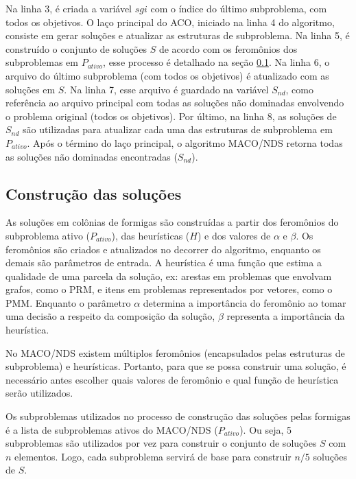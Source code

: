 Na linha 3, é criada a variável $sgi$ com o índice do último subproblema, com todos os objetivos. O laço principal do ACO, iniciado na linha 4 do algoritmo, consiste em gerar soluções e atualizar as estruturas de subproblema. Na linha 5, é construído o conjunto de soluções $S$ de acordo com os feromônios dos subproblemas em $P_{ativo}$, esse processo é detalhado na seção \ref{section_macod_solutions}. Na linha 6, o arquivo do último subproblema (com todos os objetivos) é atualizado com as soluções em $S$. Na linha 7, esse arquivo é guardado na variável $S_{nd}$, como referência ao arquivo principal com todas as soluções não dominadas envolvendo o problema original (todos os objetivos). Por último, na linha 8, as soluções de $S_{nd}$ são utilizadas para atualizar cada uma das estruturas de subproblema em $P_{ativo}$. Após o término do laço principal, o algoritmo MACO/NDS retorna todas as soluções não dominadas encontradas ($S_{nd}$).

\subsection{Construção das soluções}
\label{section_macod_solutions}

As soluções em colônias de formigas são construídas a partir dos feromônios do subproblema ativo ($P_{ativo}$), das heurísticas ($H$) e dos valores de $\alpha$ e $\beta$. Os feromônios são criados e atualizados no decorrer do algoritmo, enquanto os demais são parâmetros de entrada. A heurística é uma função que estima a qualidade de uma parcela da solução, ex: arestas em problemas que envolvam grafos, como o PRM, e itens em problemas representados por vetores, como o PMM. Enquanto o parâmetro $\alpha$ determina a importância do feromônio ao tomar uma decisão a respeito da composição da solução, $\beta$ representa a importância da heurística.

No MACO/NDS existem múltiplos feromônios (encapsulados pelas estruturas de subproblema) e heurísticas. Portanto, para que se possa construir uma solução, é necessário antes escolher quais valores de feromônio e qual função de heurística serão utilizados. 

Os subproblemas utilizados no processo de construção das soluções pelas formigas é a lista de subproblemas ativos do MACO/NDS ($P_{ativo}$). Ou seja, 5 subproblemas são utilizados por vez para construir o conjunto de soluções $S$ com $n$ elementos. Logo, cada subproblema servirá de base para construir $n/5$ soluções de $S$.

